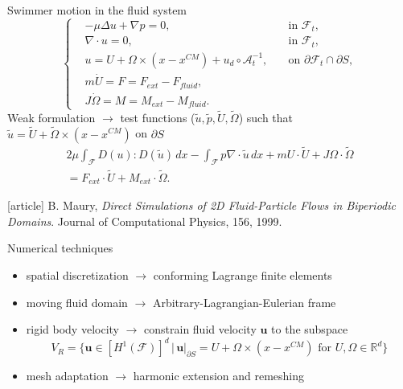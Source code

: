 \documentclass{beamer}
\begin{document}
	\begin{frame}{Swimmer motion in the fluid system}
		\begin{equation*}
		\left\{
		\begin{aligned}
		&-\mu \Delta u + \nabla p = 0, \quad &\text{in  $\mathcal{F}_t$},\\
		&\nabla \cdot u = 0, \quad &\text{in  $\mathcal{F}_t$},\\
		&u = U+ \Omega \times (x-x^{CM}) + u_d  \circ \mathcal{A}_t^{-1}, \quad &\text{on  $\partial \mathcal{F}_t \cap \partial S$},\\
		&m \dot{U} = F = F_{ext}-F_{fluid},\\
		&J \dot{\Omega} = M = M_{ext}-M_{fluid}.
		\end{aligned}
		\right.
		\end{equation*}
		Weak formulation $\rightarrow$ test functions ($\tilde{u},\tilde{p},\tilde{U},\tilde{\Omega}$) such that $\tilde{u}=\tilde{U}+\tilde{\Omega}\times (x-x^{CM}) $ on $\partial S$
		\begin{multline*}
		2\mu\int_\mathcal{F} D(u) : D(\tilde{u}) \, dx-\int_{\mathcal{F}} p \nabla\cdot \tilde{u} \, dx + m U \cdot \tilde{U} + 	J \Omega \cdot \tilde{\Omega} \\= F_{ext}\cdot\tilde{U} +M_{ext}\cdot\tilde{\Omega}.
		\label{Eq:Compacted}
		\end{multline*}
		\begin{thebibliography}{9}	[article] \tiny
		B. Maury, \textit{Direct Simulations of 2D Fluid-Particle Flows in Biperiodic Domains}. Journal of Computational Physics, 156, 1999.
		\end{thebibliography}
		\end{frame}
		\begin{frame}{Numerical techniques}
			\begin{itemize}
				\item spatial discretization $\to$ conforming Lagrange finite elements
				\item moving fluid domain $\to$ Arbitrary-Lagrangian-Eulerian frame
				\item rigid body velocity $\to$ constrain fluid velocity $\textbf{u}$ to the subspace 
				\[
					V_{R} = \{\textbf{u} \in [H^1(\mathcal{F})]^d\, |\, \textbf{u}|_{\partial S}  = U+\Omega\times (x-x^{CM}) \text{ for $U,\Omega \in \mathbb{R}^d$}\}
				\]
				\item mesh adaptation $\to$ harmonic extension and remeshing
			\end{itemize}
		\end{frame}
\end{document}
